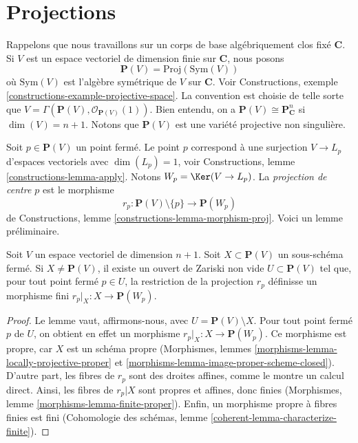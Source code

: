 \section{Projections}
\label{section-projection}

\noindent
Rappelons que nous travaillons sur un corps de base algébriquement clos fixé
$\mathbf{C}$. Si $V$ est un espace vectoriel de dimension finie sur $\mathbf{C}$,
nous posons
$$
\mathbf{P}(V) = \text{Proj}(\text{Sym}(V))
$$
où $\text{Sym}(V)$ est l'algèbre symétrique de $V$ sur $\mathbf{C}$.
Voir Constructions, exemple \ref{constructions-example-projective-space}.
La convention est choisie de telle sorte que
$V = \Gamma(\mathbf{P}(V), \mathcal{O}_{\mathbf{P}(V)}(1))$.
Bien entendu, on a $\mathbf{P}(V) \cong \mathbf{P}^n_{\mathbf{C}}$ si
$\dim(V) = n + 1$. Notons que $\mathbf{P}(V)$ est une variété projective
non singulière.

\medskip\noindent
Soit $p \in \mathbf{P}(V)$ un point fermé. Le point $p$ correspond à une
surjection $V \to L_p$ d'espaces vectoriels avec $\dim(L_p) = 1$, voir
Constructions, lemme \ref{constructions-lemma-apply}.
Notons $W_p = \Ker(V \to L_p)$.
La {\it projection de centre $p$} est le morphisme
$$
r_p : \mathbf{P}(V) \setminus \{p\} \longrightarrow \mathbf{P}(W_p)
$$
de Constructions, lemme \ref{constructions-lemma-morphism-proj}.
Voici un lemme préliminaire.

\begin{lemma}
\label{lemma-projection-generically-finite}
Soit $V$ un espace vectoriel de dimension $n + 1$.
Soit $X \subset \mathbf{P}(V)$ un sous-schéma fermé.
Si $X \not = \mathbf{P}(V)$, il existe un ouvert de Zariski non vide
$U \subset \mathbf{P}(V)$
tel que, pour tout point fermé $p \in U$, la restriction
de la projection $r_p$ définisse un morphisme fini
$r_p|_X : X \to \mathbf{P}(W_p)$.
\end{lemma}

\begin{proof}
Le lemme vaut, affirmons-nous, avec $U = \mathbf{P}(V) \setminus X$. Pour tout point
fermé $p$ de $U$, on obtient en effet un morphisme $r_p|_X : X \to \mathbf{P}(W_p)$.
Ce morphisme est propre, car $X$ est un schéma propre
(Morphismes, lemmes \ref{morphisms-lemma-locally-projective-proper} et
\ref{morphisms-lemma-image-proper-scheme-closed}). D'autre part, les
fibres de $r_p$ sont des droites affines, comme le montre un calcul direct.
Ainsi, les fibres de $r_p|X$ sont propres et affines, donc finies
(Morphismes, lemme \ref{morphisms-lemma-finite-proper}).
Enfin, un morphisme propre à fibres finies est fini
(Cohomologie des schémas, lemme \ref{coherent-lemma-characterize-finite}).
\end{proof}

